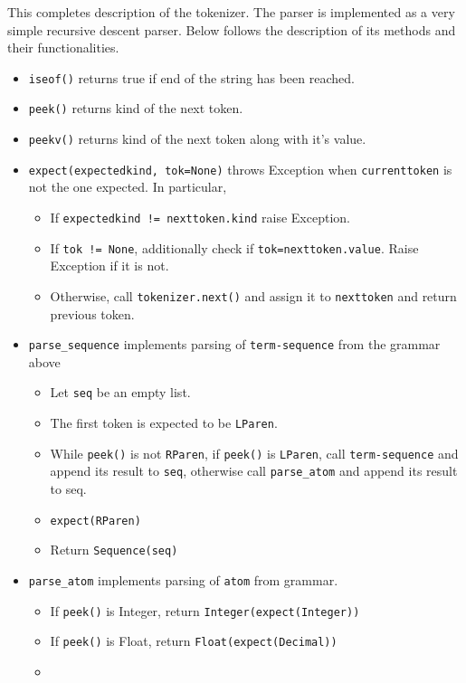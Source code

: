 This completes description of the tokenizer. The parser is implemented as a very simple recursive descent parser. Below follows the description of its methods and their functionalities.

\begin{itemize}
\item
\texttt{iseof()} returns true if end of the string has been reached.

\item
\texttt{peek()} returns kind of the next token. 

\item
\texttt{peekv()} returns kind of the next token along with it's value.

\item 
\texttt{expect(expectedkind, tok=None)} throws Exception when \texttt{currenttoken} is not the one expected. In particular,
	\begin{itemize}
		\item
		If \texttt{expectedkind != nexttoken.kind} raise Exception.
		\item
		If \texttt{tok != None}, additionally check if \texttt{tok=nexttoken.value}. Raise Exception if it is not.
		\item
		Otherwise, call \texttt{tokenizer.next()} and assign it to \texttt{nexttoken} and return previous token. 
	\end{itemize}

\item 
	\texttt{parse\_sequence} implements parsing of \texttt{term-sequence} from the grammar above
	\begin{itemize}
		\item
		Let \texttt{seq} be an empty list.

		\item
		The first token is expected to be \texttt{LParen}.

		\item
		While \texttt{peek()} is not \texttt{RParen}, if \texttt{peek()} is \texttt{LParen}, call \texttt{term-sequence} and append its result to \texttt{seq}, otherwise call \texttt{parse\_atom} and append its result to seq.
	
		\item
		\texttt{expect(RParen)} 

		\item
		Return \texttt{Sequence(seq)}
	\end{itemize}

\item
\texttt{parse\_atom} implements parsing of \texttt{atom} from grammar.
	\begin{itemize}
	\item
		If \texttt{peek()} is Integer, return \texttt{Integer(expect(Integer))}
	\item
		If \texttt{peek()} is Float, return \texttt{Float(expect(Decimal))}
	\item


\end{itemize}
\end{itemize}
